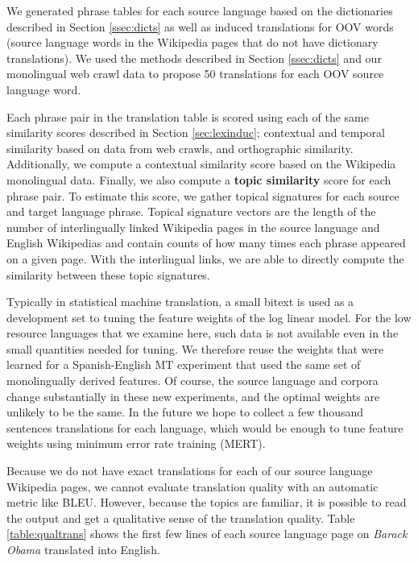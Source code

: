 \documentclass[11pt]{article}
\begin{document}
We generated phrase tables for each source language based on the dictionaries described in Section \ref{ssec:dicts} as well as induced translations for OOV words (source language words in the Wikipedia pages that do not have dictionary translations). We used the methods described in Section \ref{ssec:dicts} and our monolingual web crawl data to propose 50 translations for each OOV source language word.

Each phrase pair in the translation table is scored using each of the same similarity scores described in Section \ref{sec:lexinduc}; contextual and temporal similarity based on data from web crawls, and orthographic similarity. Additionally, we compute a contextual similarity score based on the Wikipedia monolingual data. Finally, we also compute a {\bf topic similarity} score for each phrase pair. To estimate this score, we gather topical signatures for each source and target language phrase. Topical signature vectors are the length of the number of interlingually linked Wikipedia pages in the source language and English Wikipedias and contain counts of how many times each phrase appeared on a given page. With the interlingual links, we are able to directly compute the similarity between these topic signatures. 

Typically in statistical machine translation, a small bitext is used as a development set to tuning the feature weights of the log linear model.  For the low resource languages that we examine here, such data is not available even in the small quantities needed for tuning.  We therefore reuse the weights that were learned for a Spanish-English MT experiment that used the same set of monolingually derived features. Of course, the source language and corpora change substantially in these new experiments, and the optimal weights are unlikely to be the same. In the future we hope to collect a few thousand sentences translations for each language, which would be enough to tune feature weights using minimum error rate training (MERT).

Because we do not have exact translations for each of our source language Wikipedia pages, we cannot evaluate translation quality with an automatic metric like BLEU. However, because the topics are familiar, it is possible to read the output and get a qualitative sense of the translation quality. Table \ref{table:qualtrans} shows the first few lines of each source language page on {\it Barack Obama} translated into English.
\end{document}

